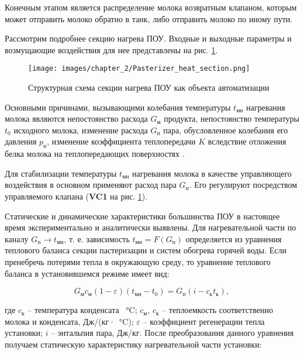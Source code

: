 Конечным этапом является распределение молока возвратным клапаном, которым может отправить молоко обратно в танк, либо отправить молоко по иному пути.

Рассмотрим подробнее секцию нагрева ПОУ. Входные и выходные параметры и возмущающие воздействия для нее представлены на рис. \ref{fig:Pasterizer_heat_section}.

\begin{figure}[H]
    \centering
    \texttt{[image: images/chapter\_2/Pasterizer\_heat\_section.png]}
    \caption{Структурная схема секции нагрева ПОУ как объекта автоматизации}
    \label{fig:Pasterizer_heat_section}
\end{figure}

Основными причинами, вызывающими колебания температуры $t_\text{мн}$ нагревания молока являются непостоянство расхода $G_\text{м}$ продукта, непостоянство температуры $t_0$ исходного молока, изменение расхода $G_\text{п}$ пара, обусловленное колебания его давления $p_\text{п}$, изменение коэффициента теплопередачи $K$ вследствие отложения белка молока на теплопередающих поверхностях \cite{Вайнберг1978}.

Для стабилизации температуры $t_\text{мн}$ нагревания молока в качестве управляющего воздействия в основном применяют расход пара $G_\text{п}$. Его регулируют посредством управляемого клапана (\textbf{VC1} на рис. \ref{fig:Pasterizer_heat_section}).

Статические и динамические характеристики большинства ПОУ в настоящее время экспериментально и аналитически выявлены. Для нагревательной части по каналу $G_\text{п} \rightarrow t_\text{мн}$, т. е. зависимость $t_\text{мн}=F(G_\text{п})$ определяется из уравнения теплового баланса секции пастеризации и систем обогрева горячей воды. Если пренебречь потерями тепла в окружающую среду, то уравнение теплового баланса в установившемся режиме имеет вид:

\begin{equation}
    G_\text{м} c_\text{м}(1 - \varepsilon)(t_\text{мн} - t_0) = G_\text{п}(i - c_\text{к} t_\text{к}),
\end{equation}

где $c_\text{к}$ – температура конденсата \SI{}{\celsius}; $c_\text{м}$, $c_\text{к}$ – теплоемкость соответственно молока и конденсата, Дж/(кг·\SI{}{\celsius}); $\varepsilon$ – коэффициент регенерации тепла установки; $i$ – энтальпия пара, Дж/кг. После преобразования данного уравнения получаем статическую характеристику нагревательной части установки:

